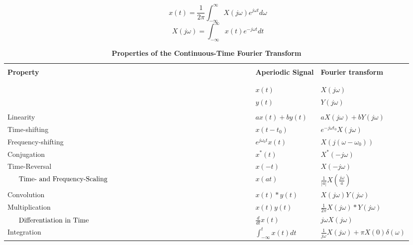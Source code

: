 \documentclass[12pt]{article}
\numberwithin{equation}{section}
\newcommand{\linestrut}{\vphantom{%
\mbox{${}_{\mathstrut}^{\mathstrut}$}%
}}
\newcommand{\dispstrut}{\vphantom{%
\mbox{$\displaystyle\int_{\mathstrut}^{\mathstrut}$}%
}}
\begin{document}
\begin{table}[htbp]
\vspace*{-1.2in}
\caption{\bf Properties of the Continuous-Time Fourier Transform}
\vspace*{-0.4in}
\begin{center}
$$x(t) = \frac{1}{2\pi} \int_{-\infty}^{\infty} X(j\omega) e^{j\omega t} d\omega$$
$$X(j\omega) = \int_{-\infty}^{\infty} x(t) e^{-j\omega t} dt$$
\hspace*{-5pc}
\begin{tabular}{p{2.25in}ll} \hline
& & \\
     {\bf Property}
  & {\bf Aperiodic Signal}
  & {\bf Fourier transform}
  \\
& & \\ \hline
& & \\
 & $\displaystyle x(t)$
  & $\displaystyle X(j\omega)$
  \\
 & $\displaystyle y(t)$
  & $\displaystyle Y(j\omega)$
  \\
\multicolumn{3}{l}{ } \\
 Linearity
  & $\displaystyle ax(t)+by(t)$
  & $\displaystyle aX(j\omega)+bY(j\omega)$
  \\
 Time-shifting
  & $\displaystyle x(t-t_{0})$
  & $\displaystyle e^{-j\omega t_{0}}X(j\omega)$
  \\
 Frequency-shifting
  & $\displaystyle e^{j\omega_{0}t}x(t)$
  & $\displaystyle X(j(\omega-\omega_0))$
  \\
 Conjugation
  & $\displaystyle x^{*}(t)$
  & $\displaystyle X^{*}(-j\omega)$
  \\
 Time-Reversal
  & $\displaystyle x(-t)$
  & $\displaystyle X(-j\omega)$
  \\
 $\vcenter{\mbox{Time- and} Frequency-Scaling}$
  & $\displaystyle x(at)$
  & $\displaystyle \frac{1}{|a|}X\left(\frac{j\omega}{a}\right)$
  \\
 Convolution \linestrut
  & $\displaystyle x(t)*y(t)$
  & $\displaystyle X(j\omega) Y(j\omega)$
  \\
 Multiplication \dispstrut
  & $\displaystyle x(t)y(t)$
  & $\displaystyle \frac{1}{2\pi} X(j\omega)*Y(j\omega)$
  \\
 $\vcenter{\mbox{Differentiation in} Time}$
  & $\displaystyle \frac{d}{dt}x(t)$
  & $\displaystyle j\omega X(j\omega)$
  \\
 Integration \dispstrut
  & $\displaystyle \int_{-\infty}^{t}x(t) dt$
  & $\displaystyle \frac{1}{j\omega} X(j\omega) + \pi X(0)
    \delta(\omega)$
  \\

\end{tabular}
\end{center}
\end{table}
\end{document}
